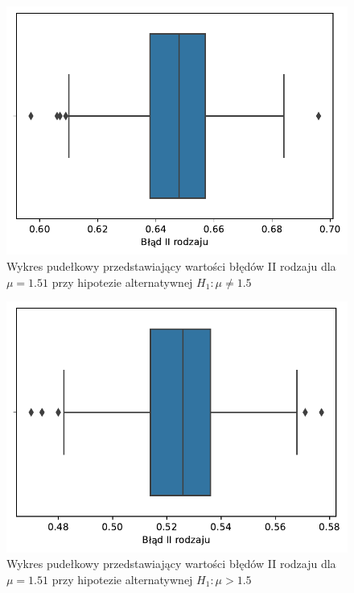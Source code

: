 \documentclass[12pt]{mwart}
\begin{document}
	\begin{figure}[H]
	\begin{center}
		\includegraphics[scale=0.6]{box7.pdf}
		\caption{Wykres pudełkowy przedstawiający wartości błędów II rodzaju dla $\mu=1.51$ przy hipotezie alternatywnej $H_1 \colon \mu \neq 1.5$}
	\end{center}
	\end{figure}
	
	
	\begin{figure}[H]
	\begin{center}
		\includegraphics[scale=0.6]{box8.pdf}
		\caption{Wykres pudełkowy przedstawiający wartości błędów II rodzaju dla $\mu=1.51$ przy hipotezie alternatywnej $H_1 \colon \mu > 1.5$}
	\end{center}
	\end{figure}
	
\end{document}
